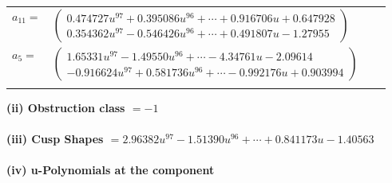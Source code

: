 \documentclass[1p]{elsarticle_modified}
\theoremstyle{definition}
\begin{document}
\begin{tabular}{m{7pt} m{180pt} m{7pt} m{180pt} }
\flushright $a_{11}=$&$\begin{pmatrix}0.474727 u^{97}+0.395086 u^{96}+\cdots+0.916706 u+0.647928\\0.354362 u^{97}-0.546426 u^{96}+\cdots+0.491807 u-1.27955\end{pmatrix}$ \\
\flushright $a_{5}=$&$\begin{pmatrix}1.65331 u^{97}-1.49550 u^{96}+\cdots-4.34761 u-2.09614\\-0.916624 u^{97}+0.581736 u^{96}+\cdots-0.992176 u+0.903994\end{pmatrix}$\\&\end{tabular}
\flushleft \textbf{(ii) Obstruction class $= -1$}\\~\\
\flushleft \textbf{(iii) Cusp Shapes $= 2.96382 u^{97}-1.51390 u^{96}+\cdots+0.841173 u-1.40563$}\\~\\
\newpage\renewcommand{\arraystretch}{1}
\flushleft \textbf{(iv) u-Polynomials at the component}\newline \\
\end{document}
